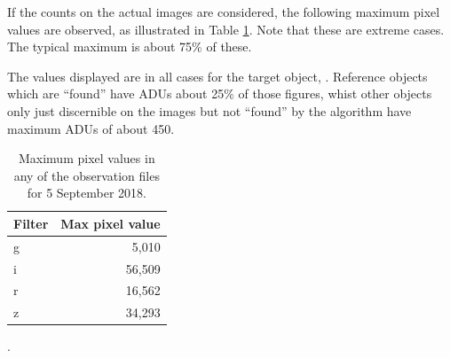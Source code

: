 If the counts on the actual images are considered, the following maximum pixel
values are observed, as illustrated in Table \ref{table:pmaxima}. Note that
these are extreme cases. The typical maximum is about 75\% of these.

The values displayed are in all cases for the target object, \bstar. Reference
objects which are ``found'' have ADUs about 25\% of those figures, whist other
objects only just discernible on the images but not ``found'' by the algorithm
have maximum ADUs of about 450.

\begin{table}[!htbp]
\begin{center}
\begin{tabular}{lr} \hline
Filter & Max pixel value \\\hline
g & 5,010 \\
i & 56,509 \\
r & 16,562 \\
z & 34,293 \\
\hline
\end{tabular}
\end{center}
\caption{Maximum pixel values in any of the observation files for 5 September
2018.}.
\protect\label{table:pmaxima}
\end{table}
\clearpage

% 
% 
% 


